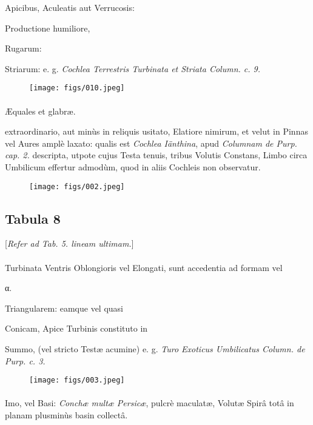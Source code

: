 \documentclass[a4paper, 11pt, oneside, polutonikogreek, german]{article}
\begin{document}
Apicibus, Aculeatis aut Verrucosis:

Productione humiliore,

Rugarum:

Striarum: e. g. \emph{Cochlea Terrestris Turbinata et Striata Column. c. 9.}

\begin{figure}[H]
\centering
\texttt{[image: figs/010.jpeg]}
\end{figure}
\paragraph{}
Æquales et glabræ.

extraordinario, aut minùs in reliquis usitato, Elatiore nimirum, et velut in Pinnas vel Aures amplè laxato: qualis est \emph{Cochlea Iänthina}, apud \emph{Columnam de Purp. cap. 2.} descripta, utpote cujus Testa tenuis, tribus Volutis Constans, Limbo circa Umbilicum effertur admodùm, quod in aliis Cochleis non observatur.

\begin{figure}[H]
\centering
\texttt{[image: figs/002.jpeg]}
\end{figure}
\clearpage
\subsection{Tabula 8}
\begin{center}
[\emph{Refer ad Tab. 5. lineam ultimam.}]
\end{center}
\paragraph{}
Turbinata Ventris Oblongioris vel Elongati, sunt accedentia ad formam vel

α.

Triangularem: eamque vel quasi

Conicam, Apice Turbinis constituto in

Summo, (vel stricto Testæ acumine) e. g. \emph{Turo Exoticus Umbilicatus Column. de Purp. c. 3.}

\begin{figure}[H]
\centering
\texttt{[image: figs/003.jpeg]}
\end{figure}
\paragraph{}
Imo, vel Basi: \emph{Conchæ multæ Persicæ}, pulcrè maculatæ, Volutæ Spirâ totâ in planam plusminùs basin collectâ.
\end{document}

